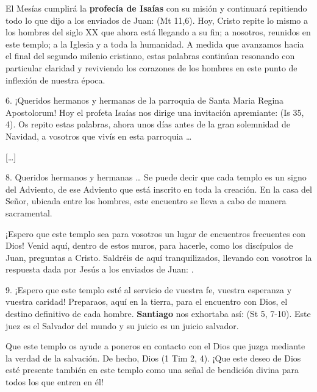 \begin{body}
\begin{body}
El Mesías cumplirá la \textbf{profecía de Isaías} con su misión y continuará repitiendo todo lo que dijo a los enviados de Juan:  (Mt 11,6). Hoy, Cristo repite lo mismo a los hombres del siglo XX que ahora está llegando a su fin; a nosotros, reunidos en este templo; a la Iglesia y a toda la humanidad. A medida que avanzamos hacia el final del segundo milenio cristiano, estas palabras continúan resonando con particular claridad y reviviendo los corazones de los hombres en este punto de inflexión de nuestra época.

6. ¡Queridos hermanos y hermanas de la parroquia de Santa Maria Regina Apostolorum! Hoy el profeta Isaías nos dirige una invitación apremiante:  (Is 35, 4). Os repito estas palabras, ahora unos días antes de la gran solemnidad de Navidad, a vosotros que vivís en esta parroquia \ldots{}

{[}\ldots{}{]}

8. Queridos hermanos y hermanas \ldots{} Se puede decir que cada templo es un signo del Adviento, de ese Adviento que está inscrito en toda la creación. En la casa del Señor, ubicada entre los hombres, este encuentro se lleva a cabo de manera sacramental.

¡Espero que este templo sea para vosotros un lugar de encuentros frecuentes con Dios! Venid aquí, dentro de estos muros, para hacerle, como los discípulos de Juan, preguntas a Cristo. Saldréis de aquí tranquilizados, llevando con vosotros la respuesta dada por Jesús a los enviados de Juan: .

9. ¡Espero que este templo esté al servicio de vuestra fe, vuestra esperanza y vuestra caridad! Preparaos, aquí en la tierra, para el encuentro con Dios, el destino definitivo de cada hombre. \textbf{Santiago} nos exhortaba así:  (St 5, 7-10). Este juez es el Salvador del mundo y su juicio es un juicio salvador.

Que este templo os ayude a poneros en contacto con el Dios que juzga mediante la verdad de la salvación. De hecho, Dios  (1 Tim 2, 4). ¡Que este deseo de Dios esté presente también en este templo como una señal de bendición divina para todos los que entren en él!


\end{body}
\end{body}

